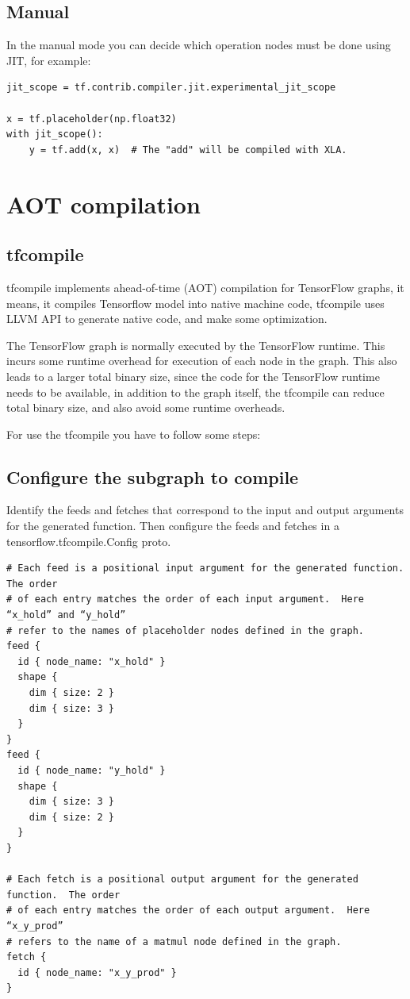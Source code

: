 \documentclass[11pt,openany]{book}
\begin{document}
\subsection{Manual}

In the manual mode you can decide which operation nodes must be done using JIT, for example:

\begin{verbatim}
jit_scope = tf.contrib.compiler.jit.experimental_jit_scope

x = tf.placeholder(np.float32)
with jit_scope():
    y = tf.add(x, x)  # The "add" will be compiled with XLA.
\end{verbatim}

\section{AOT compilation}
\subsection{tfcompile}

tfcompile implements ahead-of-time (AOT) compilation for TensorFlow graphs, it means, it compiles Tensorflow model into native machine code, tfcompile uses LLVM API to generate native code, and make some optimization.

The TensorFlow graph is normally executed by the TensorFlow runtime. This incurs some runtime overhead for execution of each node in the graph. This also leads to a larger total binary size, since the code for the TensorFlow runtime needs to be available, in addition to the graph itself, the tfcompile can reduce total binary size, and also avoid some runtime overheads.

For use the tfcompile you have to follow some steps:

\subsection{Configure the subgraph to compile}

Identify the feeds and fetches that correspond to the input and output arguments for the generated function. Then configure the feeds and fetches in a tensorflow.tfcompile.Config proto.

\begin{verbatim}
# Each feed is a positional input argument for the generated function.  The order
# of each entry matches the order of each input argument.  Here “x_hold” and “y_hold”
# refer to the names of placeholder nodes defined in the graph.
feed {
  id { node_name: "x_hold" }
  shape {
    dim { size: 2 }
    dim { size: 3 }
  }
}
feed {
  id { node_name: "y_hold" }
  shape {
    dim { size: 3 }
    dim { size: 2 }
  }
}

# Each fetch is a positional output argument for the generated function.  The order
# of each entry matches the order of each output argument.  Here “x_y_prod”
# refers to the name of a matmul node defined in the graph.
fetch {
  id { node_name: "x_y_prod" }
}
\end{verbatim}
\end{document}
